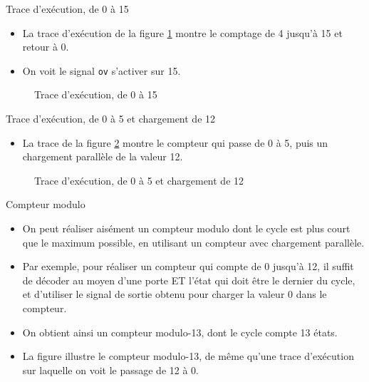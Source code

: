 \documentclass[presentation]{beamer}
\begin{document}
\begin{frame}[label={sec:orgf8c3367},fragile]{Trace d'exécution, de 0 à 15}
 \begin{itemize}
\item La trace d'exécution de la figure \ref{fig:org852c1c1} montre le comptage de 4 jusqu'à 15 et retour à 0.

\item On voit le signal \texttt{ov} s'activer sur 15.
\end{itemize}

\begin{figure}[htbp]
\centering

\caption{\label{fig:org852c1c1}Trace d'exécution, de 0 à 15}
\end{figure}
\end{frame}

\begin{frame}[label={sec:org88b8854}]{Trace d'exécution, de 0 à 5 et chargement de 12}
\begin{itemize}
\item La trace de la figure \ref{fig:org17b842d}  montre le compteur qui passe de 0 à 5, puis un chargement parallèle de la valeur 12.
\end{itemize}

\begin{figure}[htbp]
\centering

\caption{\label{fig:org17b842d}Trace d'exécution, de 0 à 5 et chargement de 12}
\end{figure}
\end{frame}

\begin{frame}[label={sec:orgce3a4a0}]{Compteur modulo}
\begin{itemize}
\item On peut réaliser aisément un compteur modulo dont le cycle est plus court que le maximum possible, en utilisant un compteur avec chargement parallèle.

\item Par exemple, pour réaliser un compteur qui compte de 0 jusqu'à 12, il suffit de décoder au moyen d'une porte ET l'état qui doit être le dernier du cycle, et d'utiliser le signal de sortie obtenu pour charger la valeur 0 dans le compteur.

\item On obtient ainsi un compteur modulo-13, dont le cycle compte 13 états.

\item La figure illustre le compteur modulo-13, de même qu'une trace d'exécution sur laquelle on voit le passage de 12 à 0.
\end{itemize}
\end{frame}
\end{document}
